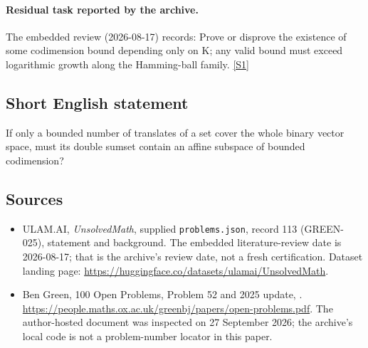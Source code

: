 \documentclass[11pt,a4paper]{article}
\newcommand{\sref}[2]{\hyperlink{source:#1:#2}{[S#2]}}
\begin{document}
\paragraph{Residual task reported by the archive.}

The embedded review (2026-08-17) records: Prove or disprove the existence of some codimension bound depending only on K; any valid bound must exceed logarithmic growth along the Hamming-ball family. \sref{113}{1}

\subsection{Short English statement}

If only a bounded number of translates of a set cover the whole binary vector space, must its double sumset contain an affine subspace of bounded codimension?

\subsection{Sources}

{\small

\begin{itemize}

\item[\hypertarget{source:113:1}{S1}] ULAM.AI, \emph{UnsolvedMath}, supplied \texttt{problems.json}, record 113 (GREEN-025), statement and background. The embedded literature-review date is 2026-08-17; that is the archive’s review date, not a fresh certification. Dataset landing page: \url{https://huggingface.co/datasets/ulamai/UnsolvedMath}.

\item[\hypertarget{source:113:2}{S2}] Ben Green, 100 Open Problems, Problem 52 and 2025 update, . \url{https://people.maths.ox.ac.uk/greenbj/papers/open-problems.pdf}. The author-hosted document was inspected on 27 September 2026; the archive’s local code is not a problem-number locator in this paper.

\end{itemize}

}

\label{end:113}
\end{document}
